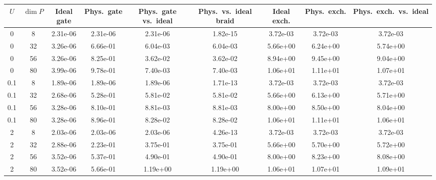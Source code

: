 \begin{tabular}{ccccccccc}
\hline
$U$ & $\dim P$ & Ideal gate & Phys.\ gate & Phys.\ gate vs.\ ideal & Phys.\ vs.\ ideal braid & Ideal exch. & Phys.\ exch. & Phys.\ exch.\ vs.\ ideal \\
\hline
0 & 8 & 2.31e-06 & 2.31e-06 & 2.31e-06 & 1.82e-15 & 3.72e-03 & 3.72e-03 & 3.72e-03 \\
0 & 32 & 3.26e-06 & 6.66e-01 & 6.04e-03 & 6.04e-03 & 5.66e+00 & 6.24e+00 & 5.74e+00 \\
0 & 56 & 3.26e-06 & 8.25e-01 & 3.62e-02 & 3.62e-02 & 8.94e+00 & 9.45e+00 & 9.04e+00 \\
0 & 80 & 3.99e-06 & 9.78e-01 & 7.40e-03 & 7.40e-03 & 1.06e+01 & 1.11e+01 & 1.07e+01 \\
\hline
0.1 & 8 & 1.89e-06 & 1.89e-06 & 1.89e-06 & 1.71e-13 & 3.72e-03 & 3.72e-03 & 3.72e-03 \\
0.1 & 32 & 2.68e-06 & 5.28e-01 & 5.81e-02 & 5.81e-02 & 5.66e+00 & 6.13e+00 & 5.71e+00 \\
0.1 & 56 & 3.28e-06 & 8.10e-01 & 8.81e-03 & 8.81e-03 & 8.00e+00 & 8.50e+00 & 8.04e+00 \\
0.1 & 80 & 3.28e-06 & 8.96e-01 & 8.28e-02 & 8.28e-02 & 1.06e+01 & 1.11e+01 & 1.06e+01 \\
\hline
2 & 8 & 2.03e-06 & 2.03e-06 & 2.03e-06 & 4.26e-13 & 3.72e-03 & 3.72e-03 & 3.72e-03 \\
2 & 32 & 2.88e-06 & 2.23e-01 & 3.75e-01 & 3.75e-01 & 5.66e+00 & 5.70e+00 & 5.72e+00 \\
2 & 56 & 3.52e-06 & 5.37e-01 & 4.90e-01 & 4.90e-01 & 8.00e+00 & 8.23e+00 & 8.08e+00 \\
2 & 80 & 3.52e-06 & 5.66e-01 & 1.19e+00 & 1.19e+00 & 1.06e+01 & 1.07e+01 & 1.09e+01 \\
\hline
\end{tabular}
